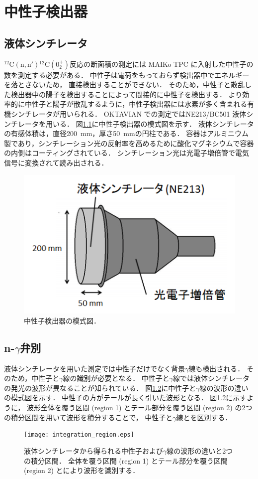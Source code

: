 \documentclass[../master]{subfiles}
\begin{document}
\chapter{中性子検出器}
\section{液体シンチレータ}
${}^{12}\mathrm{C}(\mathrm{n},\mathrm{n}'){}^{12}\mathrm{C} (0_2^+)$反応の断面積の測定には
MAIKo TPC に入射した中性子の数を測定する必要がある．
中性子は電荷をもっておらず検出器中でエネルギーを落とさないため，
直接検出することができない．
そのため，中性子と散乱した検出器中の陽子を検出することによって間接的に中性子を検出する．
より効率的に中性子と陽子が散乱するように，中性子検出器には水素が多く含まれる有機シンチレータが用いられる．
OKTAVIAN での測定ではNE213/BC501 液体シンチレータを用いる．
図\ref{fig::neutron_detector}に中性子検出器の模式図を示す．
液体シンチレータの有感体積は，直径\SI{200}{\milli\metre}，厚さ\SI{50}{\milli\metre}の円柱である．
容器はアルミニウム製であり，シンチレーション光の反射率を高めるために酸化マグネシウムで容器の内側はコーティングされている．
シンチレーション光は光電子増倍管で電気信号に変換されて読み出される．
\begin{figure}
  \centering
  \includegraphics[clip, width=0.6\columnwidth]{pic/neutron_detector.png}
  \caption{中性子検出器の模式図．}
  \label{fig::neutron_detector}
\end{figure}

\section{n-\texorpdfstring{$\gamma$}{gamma}弁別}
液体シンチレータを用いた測定では中性子だけでなく背景$\gamma$線も検出される．
そのため，中性子と$\gamma$線の識別が必要となる．
中性子と$\gamma$線では液体シンチレータの発光の波形が異なることが知られている．
図\ref{fig::pulse_shape_n_gamma}に中性子と$\gamma$線の波形の違いの模式図を示す．
中性子の方がテールが長く引いた波形となる．
図\ref{fig::pulse_shape_n_gamma}に示すように，
波形全体を覆う区間 (region 1) とテール部分を覆う区間 (region 2) の2つの積分区間を用いて波形を積分することで，
中性子と$\gamma$線とを区別する．
\begin{figure}
  \centering
  \texttt{[image: integration\_region.eps]}
  \caption[液体シンチレータから得られる中性子および$\gamma$線の波形の違いと2つの積分区間．]
          {液体シンチレータから得られる中性子および$\gamma$線の波形の違いと2つの積分区間．
            全体を覆う区間 (region 1) とテール部分を覆う区間 (region 2) とにより波形を識別する．
          }
  \label{fig::pulse_shape_n_gamma} 
\end{figure}
\end{document}
